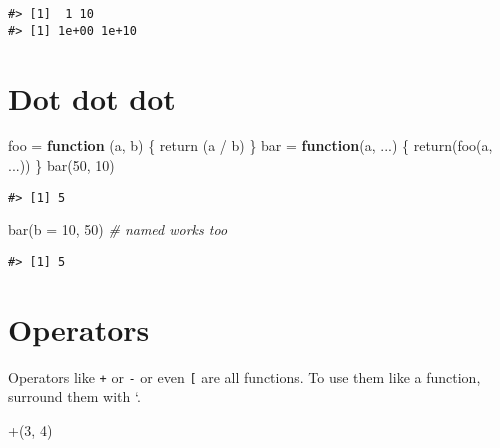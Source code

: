 \documentclass[
]{book}
\newenvironment{Shaded}{\begin{snugshade}}{\end{snugshade}}
\newcommand{\AttributeTok}[1]{\textcolor[rgb]{0.77,0.63,0.00}{#1}}
\newcommand{\CommentTok}[1]{\textcolor[rgb]{0.56,0.35,0.01}{\textit{#1}}}
\newcommand{\ControlFlowTok}[1]{\textcolor[rgb]{0.13,0.29,0.53}{\textbf{#1}}}
\newcommand{\DecValTok}[1]{\textcolor[rgb]{0.00,0.00,0.81}{#1}}
\newcommand{\FunctionTok}[1]{\textcolor[rgb]{0.00,0.00,0.00}{#1}}
\newcommand{\NormalTok}[1]{#1}
\newcommand{\OtherTok}[1]{\textcolor[rgb]{0.56,0.35,0.01}{#1}}
\newcommand{\SpecialCharTok}[1]{\textcolor[rgb]{0.00,0.00,0.00}{#1}}
\newcommand{\StringTok}[1]{\textcolor[rgb]{0.31,0.60,0.02}{#1}}
\begin{document}
\begin{verbatim}
#> [1]  1 10
#> [1] 1e+00 1e+10
\end{verbatim}

\hypertarget{dot-dot-dot}{%
\section{Dot dot dot}\label{dot-dot-dot}}

\begin{Shaded}
\begin{Highlighting}[]
\NormalTok{foo }\OtherTok{=} \ControlFlowTok{function}\NormalTok{ (a, b) \{}
  \FunctionTok{return}\NormalTok{ (a }\SpecialCharTok{/}\NormalTok{ b)}
\NormalTok{\}}
\NormalTok{bar }\OtherTok{=} \ControlFlowTok{function}\NormalTok{(a, ...) \{}
  \FunctionTok{return}\NormalTok{(}\FunctionTok{foo}\NormalTok{(a, ...))}
\NormalTok{\}}
\FunctionTok{bar}\NormalTok{(}\DecValTok{50}\NormalTok{, }\DecValTok{10}\NormalTok{)}
\end{Highlighting}
\end{Shaded}

\begin{verbatim}
#> [1] 5
\end{verbatim}

\begin{Shaded}
\begin{Highlighting}[]
\FunctionTok{bar}\NormalTok{(}\AttributeTok{b =} \DecValTok{10}\NormalTok{, }\DecValTok{50}\NormalTok{) }\CommentTok{\# named works too}
\end{Highlighting}
\end{Shaded}

\begin{verbatim}
#> [1] 5
\end{verbatim}

\hypertarget{operators}{%
\section{Operators}\label{operators}}

Operators like \texttt{+} or \texttt{-} or even \texttt{{[}} are all functions. To use them like a function, surround them with `.

\begin{Shaded}
\begin{Highlighting}[]
\StringTok{\textasciigrave{}}\AttributeTok{+}\StringTok{\textasciigrave{}}\NormalTok{(}\DecValTok{3}\NormalTok{, }\DecValTok{4}\NormalTok{)}
\end{Highlighting}
\end{Shaded}
\end{document}
